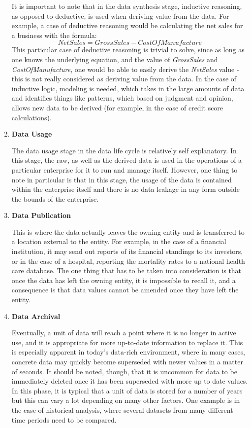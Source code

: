 \documentclass{sigchi}
\begin{document}
\begin{enumerate}
It is important to note that in the data synthesis stage, inductive reasoning, as opposed to deductive, is used when deriving value from the data. For example, a case of deductive reasoning would be calculating the net sales for a business with the formula:
\[Net Sales = Gross Sales - Cost Of Manufacture \]
This particular case of deductive reasoning is trivial to solve, since as long as one knows the underlying equation, and the value of \textit{GrossSales} and \textit{CostOfManufacture}, one would be able to easily derive the \textit{NetSales} value - this is not really considered as deriving value from the data. In the case of inductive logic, modeling is needed, which takes in the large amounts of data and identifies things like patterns, which based on judgment and opinion, allows new data to be derived (for example, in the case of credit score calculations).

\item \textbf{Data Usage}

The data usage stage in the data life cycle is relatively self explanatory. In this stage, the raw, as well as the derived data is used in the operations of a particular enterprise for it to run and manage itself. However, one thing to note in particular is that in this stage, the usage of the data is contained within the enterprise itself and there is no data leakage in any form outside the bounds of the enterprise.

\item \textbf{Data Publication}

This is where the data actually leaves the owning entity and is transferred to a location external to the entity. For example, in the case of a financial institution, it may send out reports of its financial standings to its investors, or in the case of a hospital, reporting the mortality rates to a national health care database. The one thing that has to be taken into consideration is that once the data has left the owning entity, it is impossible to recall it, and a consequence is that data values cannot be amended once they have left the entity.

\item \textbf{Data Archival}

Eventually, a unit of data will reach a point where it is no longer in active use, and it is appropriate for more up-to-date information to replace it. This is especially apparent in today's data-rich environment, where in many cases, concrete data may quickly become superseded with newer values in a matter of seconds. It should be noted, though, that it is uncommon for data to be immediately deleted once it has been superseded with more up to date values. In this phase, it is typical that a unit of data is stored for a number of years but this can vary a lot depending on many other factors. One example is in the case of historical analysis, where several datasets from many different time periods need to be compared.


\end{enumerate}
\end{document}
